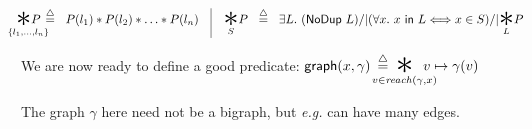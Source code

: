 \vspace{-1em}
\[
\begin{array}{@{}l@{}}
\!\!\!\!\!\!\!\underset{\{l_1,\dots,l_n\}}{\bigstar P}\!\!\!\!\!\!\! ~~ \defeq ~~ P(l_1) *
  P(l_2) * \dots * P(l_n) \quad \vline \quad
\underset{S}{\bigstar} P ~~ \defeq ~~ \exists L.~ (\p{NoDup}\ L) /| (\forall x.~ x\ \p{in}\ L <=> x \in S) /| \underset{L}{\bigstar}P
\end{array}
\]

We are now ready to define a good  predicate:
  \quad $\p{graph}(x, \gamma) \; \defeq \; \!\!\!\!\!\!\!\!\!\!\underset{v \in \mathit{reach}(\gamma, x)}{\bigstar}\!\!\!\!\!\!v\mapsto\gamma(v)$
\iffalse
\begin{equation*}
  \underset{\{l_1, l_2,\dots,l_n\}}{\bigstar}P ~~ \defeq ~~ P(l_1) *
  P(l_2) * \dots * P(l_n).
\end{equation*}
Formally $\bigstar$ is defined over a list rather than a set and is parameterized by a predicate $P$.  It is natural to extend $\bigstar$ to a set $S$ with an existentially-quantified duplicate-free list~$L$:
\[
\underset{S}{\bigstar} P ~~ \defeq ~~ \exists L.~ (\p{NoDup}\ L) /| (\forall x.~ x\ \p{in}\ L <=> x \in S) /| \underset{L}{\bigstar}P
\]
We use the same $\bigstar$ notation since the concepts are similar, but the existential adds a little pain since we need to prove that all choices of $L$ yield equivalent predicates.

We are now ready to give a good \p{graph} predicate:
\fi

The graph $\gamma$ here need not be a bigraph, but \emph{e.g.} can have many edges.

